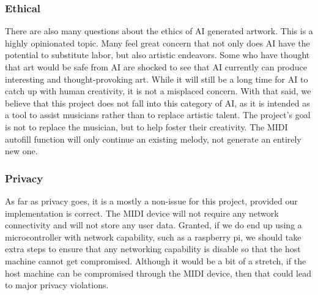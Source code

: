 \subsubsection{Ethical}

There are also many questions about the ethics of AI generated artwork. This is a highly
opinionated topic. Many feel great concern that not only does AI have the potential to
substitute labor, but also artistic endeavors. Some who have thought that art would be
safe from AI are shocked to see that AI currently can produce interesting and
thought-provoking art. While it will still be a long time for AI to catch up with human
creativity, it is not a misplaced concern. With that said, we believe that this project
does not fall into this category of AI, as it is intended as a tool to assist musicians
rather than to replace artistic talent. The project’s goal is not to replace the musician,
but to help foster their creativity. The MIDI autofill function will only continue an
existing melody, not generate an entirely new one.

\subsubsection{Privacy}

As far as privacy goes, it is a mostly a non-issue for this project, provided our
implementation is correct. The MIDI device will not require any network connectivity and
will not store any user data. Granted, if we do end up using a microcontroller with
network capability, such as a raspberry pi, we should take extra steps to ensure that any
networking capability is disable so that the host machine cannot get compromised. Although
it would be a bit of a stretch, if the host machine can be compromised through the MIDI
device, then that could lead to major privacy violations.